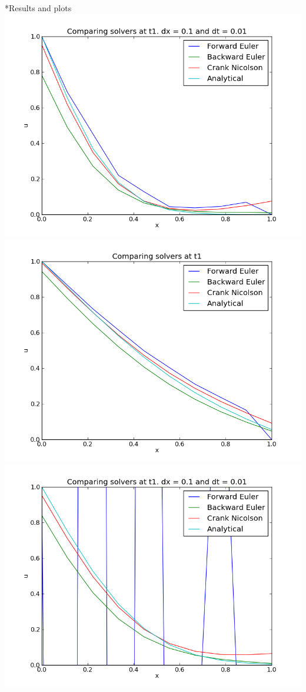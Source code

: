 \documentclass[a4paper, 12pt, titlepage]{article}
\begin{document}
  \begin{section}*{Results and plots}
    \includegraphics[width=1\textwidth]{build-project4-Desktop-Debug/solverst1.png}
    \includegraphics[width=1\textwidth]{build-project4-Desktop-Debug/solverst2.png}
    \includegraphics[width=1\textwidth]{build-project4-Desktop-Debug/solverst1_crash.png}
  \end{section}

  
\end{document}
